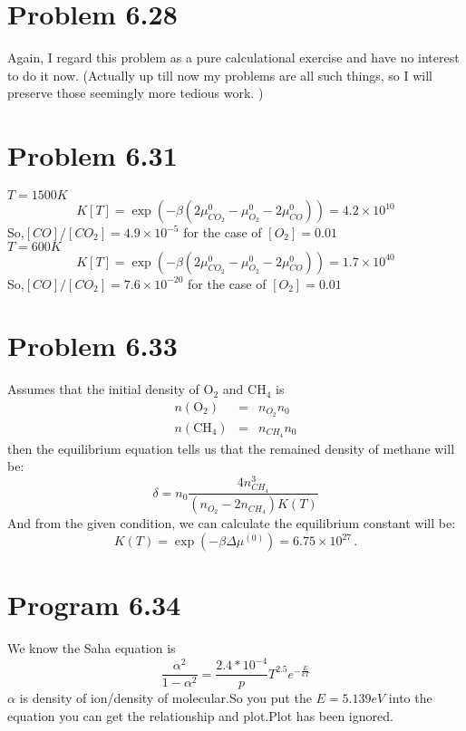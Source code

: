 \documentclass{article}
\begin{document}


\section*{Problem 6.28}
Again, I regard this problem as a pure calculational exercise and have no interest to do it now. (Actually up till now my problems are all such things, so I will preserve those seemingly more tedious work. )



\section*{Problem 6.31}
$T=1500K$
\begin{equation}
K[T] = \exp(-\beta(2\mu^{0}_{CO_2}-\mu^{0}_{O_2}-2\mu^{0}_{CO})) = 4.2 \times 10^{10}
\end{equation}
So,$[CO]/[CO_2] = 4.9 \times 10^{-5}$ for the case of $[O_2] = 0.01$\\
$T = 600 K$
\begin{equation}
K[T] = \exp(-\beta(2\mu^{0}_{CO_2}-\mu^{0}_{O_2}-2\mu^{0}_{CO})) = 1.7 \times 10^{40}
\end{equation}
So,$[CO]/[CO_2] = 7.6 \times 10^{-20}$ for the case of $[O_2] = 0.01$



\section*{Problem 6.33}
Assumes that the initial density of $\mathrm{O}_2$ and $\mathrm{CH}_4$ is 
\begin{eqnarray*}
n(\mathrm{O}_2) &=& n_{O_2}n_0\\
n(\mathrm{CH}_4)&=& n_{CH_4}n_0
\end{eqnarray*}
then the equilibrium equation tells us that the remained density of methane will be:
\begin{equation}
\delta = n_0 \frac{4n_{CH_4}^3}{(n_{O_2}-2n_{CH_4})K(T)}
\end{equation}
And from the given condition, we can calculate the equilibrium constant will be:
\begin{equation}
K(T) = \exp\left(-\beta \Delta \mu^{(0)}\right) = 6.75\times 10^{27}\,.
\end{equation}


\section*{Program 6.34}
We know the Saha equation is
$$\frac{\alpha^2}{1-\alpha^2}=\frac{2.4*10^{-4}}{p}T^2.5e^{-\frac{E}{kT}}$$
$\alpha$ is density of ion/density of molecular.So you put the $E=5.139eV$ into the equation you can get the relationship and plot.Plot has been ignored.
\end{document}
